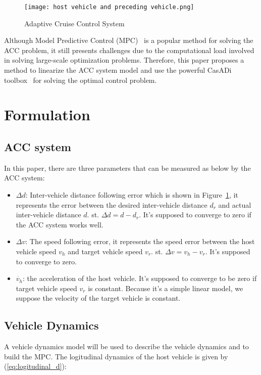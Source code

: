 \documentclass{article}
\numberwithin{equation}{section}
\begin{document}
\begin{figure}[h!]
    \centering
    \texttt{[image: host vehicle and preceding vehicle.png]}
    \caption{Adaptive Cruise Control System}
    \label{fig:structure}
\end{figure}

Although Model Predictive Control (MPC)~\cite{rawlings2012postface} is a
popular method for solving the ACC problem, it still presents challenges due to
the computational load involved in solving large-scale optimization problems.
Therefore, this paper proposes a method to linearize the ACC system model and
use the powerful CasADi toolbox~\cite{Andersson2018} for solving the optimal
control problem.

\section{Formulation}

\subsection{ACC system}
In this paper, there are three parameters that can be measured as below by the
ACC system:
\begin{itemize}
    \item $\Delta d$: Inter-vehicle distance following error which is shown in Figure~\ref{fig:structure}, it represents the error between the
          desired inter-vehicle distance $d_r$ and actual inter-vehicle distance $d$. st. $\Delta d=d-d_r$.
          It's supposed to converge to zero if the ACC system works well.
    \item $\Delta v$: The speed following error, it represents the speed error between the
          host vehicle speed $v_h$ and target vehicle speed $v_r$. st. $\Delta v=v_h-v_r$.
          It's supposed to converge to zero.
    \item $\dot{v_h}$: the acceleration of the host vehicle. It's supposed to converge to
          be zero if target vehicle speed $v_r$ is constant. Because it's a simple linear model, we
          suppose the velocity of the target vehicle is constant.
\end{itemize}
\subsection{Vehicle Dynamics}
A vehicle dynamics model\cite{Takahama} will be used to describe the vehicle
dynamics and to build the MPC. The logitudinal dynamics of the host vehicle is
given by (\ref{eq:logitudinal_d}):
\end{document}
